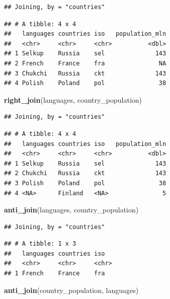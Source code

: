 \documentclass[
]{book}
\newenvironment{Shaded}{\begin{snugshade}}{\end{snugshade}}
\newcommand{\KeywordTok}[1]{\textcolor[rgb]{0.13,0.29,0.53}{\textbf{#1}}}
\newcommand{\NormalTok}[1]{#1}
\begin{document}
\begin{verbatim}
## Joining, by = "countries"
\end{verbatim}

\begin{verbatim}
## # A tibble: 4 x 4
##   languages countries iso   population_mln
##   <chr>     <chr>     <chr>          <dbl>
## 1 Selkup    Russia    sel              143
## 2 French    France    fra               NA
## 3 Chukchi   Russia    ckt              143
## 4 Polish    Poland    pol               38
\end{verbatim}

\begin{Shaded}
\begin{Highlighting}[]
\KeywordTok{right_join}\NormalTok{(languages, country_population)}
\end{Highlighting}
\end{Shaded}

\begin{verbatim}
## Joining, by = "countries"
\end{verbatim}

\begin{verbatim}
## # A tibble: 4 x 4
##   languages countries iso   population_mln
##   <chr>     <chr>     <chr>          <dbl>
## 1 Selkup    Russia    sel              143
## 2 Chukchi   Russia    ckt              143
## 3 Polish    Poland    pol               38
## 4 <NA>      Finland   <NA>               5
\end{verbatim}

\begin{Shaded}
\begin{Highlighting}[]
\KeywordTok{anti_join}\NormalTok{(languages, country_population)}
\end{Highlighting}
\end{Shaded}

\begin{verbatim}
## Joining, by = "countries"
\end{verbatim}

\begin{verbatim}
## # A tibble: 1 x 3
##   languages countries iso  
##   <chr>     <chr>     <chr>
## 1 French    France    fra
\end{verbatim}

\begin{Shaded}
\begin{Highlighting}[]
\KeywordTok{anti_join}\NormalTok{(country_population, languages)}
\end{Highlighting}
\end{Shaded}
\end{document}
